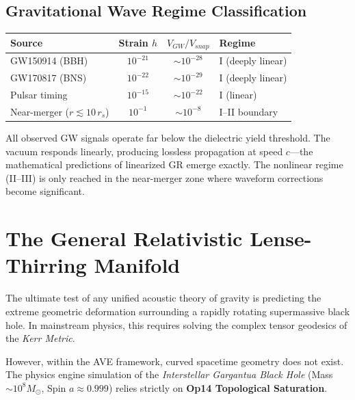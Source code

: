 \subsection*{Gravitational Wave Regime Classification}
\begin{center}
\small
\renewcommand{\arraystretch}{1.2}
\begin{tabularx}{\textwidth}{@{}lccX@{}}
\toprule
\textbf{Source} & \textbf{Strain $h$} & \textbf{$V_{GW}/V_{snap}$} & \textbf{Regime} \\
\midrule
GW150914 (BBH) & $10^{-21}$ & $\sim 10^{-28}$ & I (deeply linear) \\
GW170817 (BNS) & $10^{-22}$ & $\sim 10^{-29}$ & I (deeply linear) \\
Pulsar timing  & $10^{-15}$ & $\sim 10^{-22}$ & I (linear) \\
Near-merger ($r \lesssim 10\,r_s$) & $10^{-1}$ & $\sim 10^{-8}$ & I--II boundary \\
\bottomrule
\end{tabularx}
\end{center}

\noindent All observed GW signals operate far below the dielectric yield threshold. The vacuum responds linearly, producing lossless propagation at speed $c$---the mathematical predictions of linearized GR emerge exactly. The nonlinear regime (II--III) is only reached in the near-merger zone where waveform corrections become significant.

\section{The General Relativistic Lense-Thirring Manifold}
The ultimate test of any unified acoustic theory of gravity is predicting the extreme geometric deformation surrounding a rapidly rotating supermassive black hole. In mainstream physics, this requires solving the complex tensor geodesics of the \textit{Kerr Metric}. 

However, within the AVE framework, curved spacetime geometry does not exist. The physics engine simulation of the \textit{Interstellar Gargantua Black Hole} (Mass $\sim 10^8 M_\odot$, Spin $a \approx 0.999$) relies strictly on \textbf{Op14 Topological Saturation}. 

